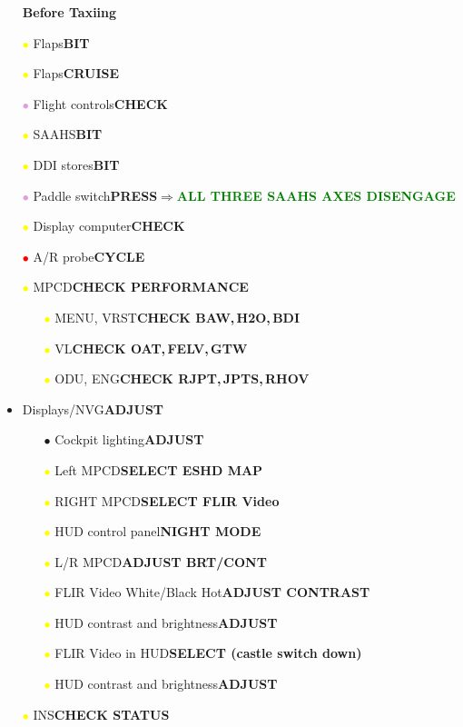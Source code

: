 \documentclass[a4paper,12pt,dvipsnames]{letter}
\newcommand{\radio}[1]{\textcolor{blue}{#1}}
\newcommand{\button}[1]{\textbf{#1}}
\newcommand{\ok}[1]{\textcolor{Green}{\textbf{#1}}}
\newcommand{\bi}{\textcolor{ProcessBlue}{$\bullet$\;}}
\newcommand{\ri}{\textcolor{Red}{$\bullet$\;}}
\newcommand{\yi}{\textcolor{Yellow}{$\bullet$\;}}
\newcommand{\vi}{\textcolor{Plum}{$\bullet$\;}}
\begin{document}
{\newpage
\begin{itemize}
\item[] {\LARGE\textbf{Before Taxiing}}
\item[\yi] Flaps\dotfill\button{BIT}
\item[\yi] Flaps\dotfill\button{CRUISE}
\item[\vi] Flight controls\dotfill\button{CHECK}
\item[\yi] SAAHS\dotfill\button{BIT}
\item[\yi] DDI stores\dotfill\button{BIT}
\item[\vi] Paddle switch\dotfill\button{PRESS}\;$\Rightarrow$\;\ok{ALL THREE SAAHS AXES DISENGAGE}
\item[\yi] Display computer\dotfill\button{CHECK}
\item[\ri] A/R probe\dotfill\button{CYCLE}
\item[\yi] MPCD\dotfill\button{CHECK PERFORMANCE}
\begin{itemize}
 \item[\yi] MENU, VRST\dotfill\button{CHECK BAW,\,H2O,\,BDI}
 \item[\yi] VL\dotfill\button{CHECK OAT,\,FELV,\,GTW}
 \item[\yi] ODU, ENG\dotfill\button{CHECK RJPT,\,JPTS,\,RHOV}
\end{itemize}
\item Displays/NVG\dotfill\button{ADJUST}
\begin{itemize}
 \item[\bi] Cockpit lighting\dotfill\button{ADJUST}
 \item[\yi] Left MPCD\dotfill\button{SELECT ESHD MAP}
 \item[\yi] RIGHT MPCD\dotfill\button{SELECT FLIR Video}
 \item[\yi] HUD control panel\dotfill\button{NIGHT MODE}
 \item[\yi] L/R MPCD\dotfill\button{ADJUST BRT/CONT}
 \item[\yi] FLIR Video White/Black Hot\dotfill\button{ADJUST CONTRAST}
 \item[\yi] HUD contrast and brightness\dotfill\button{ADJUST}
 \item[\yi] FLIR Video in HUD\dotfill\button{SELECT (castle switch down)}
 \item[\yi] HUD contrast and brightness\dotfill\button{ADJUST}
\end{itemize}
\item[\yi] INS\dotfill\button{CHECK STATUS}

\end{itemize}}
\end{document}

